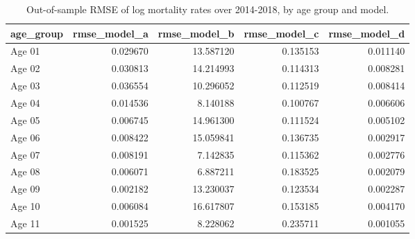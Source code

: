\begin{table}[ht]
\centering
\begin{tabular}{lrrrr}
\hline
age_group & rmse_model_a & rmse_model_b & rmse_model_c & rmse_model_d \\
\hline
Age 01 & 0.029670 & 13.587120 & 0.135153 & 0.011140 \\
Age 02 & 0.030813 & 14.214993 & 0.114313 & 0.008281 \\
Age 03 & 0.036554 & 10.296052 & 0.112519 & 0.008414 \\
Age 04 & 0.014536 & 8.140188 & 0.100767 & 0.006606 \\
Age 05 & 0.006745 & 14.961300 & 0.111524 & 0.005102 \\
Age 06 & 0.008422 & 15.059841 & 0.136735 & 0.002917 \\
Age 07 & 0.008191 & 7.142835 & 0.115362 & 0.002776 \\
Age 08 & 0.006071 & 6.887211 & 0.183525 & 0.002079 \\
Age 09 & 0.002182 & 13.230037 & 0.123534 & 0.002287 \\
Age 10 & 0.006084 & 16.617807 & 0.153185 & 0.004170 \\
Age 11 & 0.001525 & 8.228062 & 0.235711 & 0.001055 \\
\hline
\end{tabular}
\caption{Out-of-sample RMSE of log mortality rates over 2014-2018, by age group and model.}
\label{tab:revised_table_e3}
\end{table}
